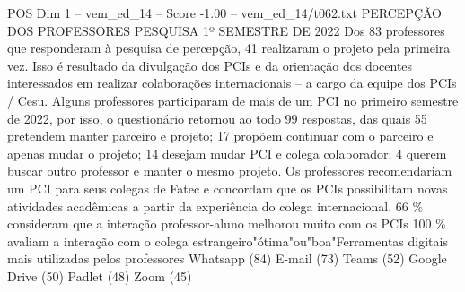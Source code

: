 \begin{textsample}{POS Dim 1 – vem\_ed\_14 – Score -1.00 – vem\_ed\_14/t062.txt}  \label{ex:f1_pos_075}
PERCEPÇÃO DOS PROFESSORES PESQUISA 1º SEMESTRE DE 2022 Dos 83 professores que responderam à pesquisa de percepção, 41 realizaram o projeto pela primeira vez.
Isso é resultado da divulgação dos PCIs e da orientação dos docentes interessados em realizar colaborações internacionais – a cargo da equipe dos PCIs / Cesu.
Alguns professores participaram de mais de um PCI no primeiro semestre de 2022, por isso, o questionário retornou ao todo 99 respostas, das quais 55 pretendem manter parceiro e projeto; 17 propõem continuar com o parceiro e apenas mudar o projeto; 14 desejam mudar PCI e colega colaborador; 4 querem buscar outro professor e manter o mesmo projeto.
Os professores recomendariam um PCI para seus colegas de Fatec e concordam que os PCIs possibilitam novas atividades acadêmicas a partir da experiência do colega internacional. 66 \% consideram que a interação professor-aluno melhorou muito com os PCIs 100 \% avaliam a interação com o colega estrangeiro"ótima"ou"boa"Ferramentas digitais mais utilizadas pelos professores Whatsapp (84) E-mail (73) Teams (52) Google Drive (50) Padlet (48) Zoom (45)

\end{textsample}
